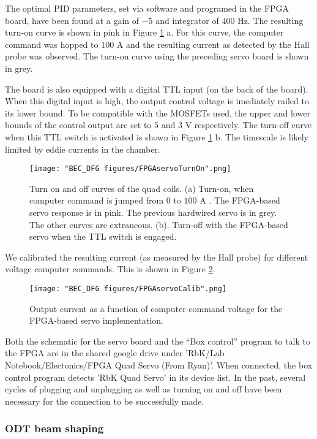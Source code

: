 The optimal PID parameters, set via software and programed in the FPGA board, have been found at a gain of $-5$ and integrator of $400$ Hz. The resulting turn-on curve is shown in pink in Figure \ref{fig:FPGAservoTurnOn} a. For this curve, the computer command was hopped to $100$ A and the resulting current as detected by the Hall probe was observed. The turn-on curve using the preceding servo board is shown in grey. 

The board is also equipped with a digital TTL input (on the back of the board). When this digital input is high, the output control voltage is imediately railed to its lower bound. To be compatible with the MOSFETs used, the upper and lower bounds of the control output are set to $5$ and $3$ V respectively. The turn-off curve when this TTL switch is activated is shown in  Figure \ref{fig:FPGAservoTurnOn} b. The timescale is likely limited by eddie currents in the chamber. 

\begin{figure}
	\texttt{[image: "BEC\_DFG figures/FPGAservoTurnOn".png]}
\caption{Turn on and off curves of the quad coils. (a) Turn-on, when computer command is jumped from $0$ to $100$ A . The FPGA-based servo response is in pink. The previous hardwired servo is in grey. The other curves are extraneous. (b). Turn-off with the FPGA-based servo when the TTL switch is engaged.}
\label{fig:FPGAservoTurnOn}
\end{figure}

We calibrated the resulting current (as measured by the Hall probe) for different voltage computer commands. This is shown in Figure \ref{fig:FPGAservoCalib}. 
\begin{figure}
	\texttt{[image: "BEC\_DFG figures/FPGAservoCalib".png]}
\caption{Output current as a function of computer command voltage for the FPGA-based servo implementation. }
\label{fig:FPGAservoCalib}
\end{figure}

Both the schematic for the servo board and the “Box control” program to talk to the FPGA are in the shared google drive under 'RbK/Lab Notebook/Electonics/FPGA Quad Servo (From Ryan)'. When connected, the box control program detects 'RbK Quad Servo' in its device list. In the past, several cycles of plugging and unplugging as well as turning on and off have been necessary for the connection to be successfully made.
\subsubsection{ODT beam shaping}

